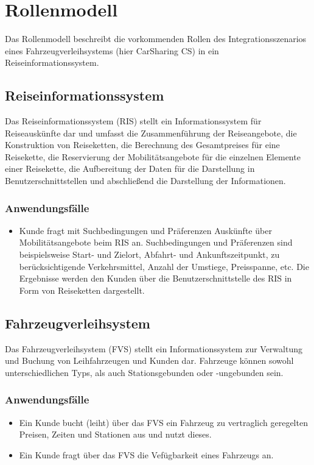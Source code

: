 \chapter{Rollenmodell}
\label{sec:Rollenmodell}

Das Rollenmodell beschreibt die vorkommenden Rollen des Integrationsszenarios eines Fahrzeugverleihsystems (hier CarSharing CS) in ein Reiseinformationssystem.

\section{Reiseinformationssystem}
Das Reiseinformationssystem (RIS) stellt ein Informationssystem für Reiseauskünfte dar und umfasst die Zusammenführung der Reiseangebote, die Konstruktion von Reiseketten, die Berechnung des Gesamtpreises für eine Reisekette, die Reservierung der Mobilitätsangebote für die einzelnen Elemente einer Reisekette, die Aufbereitung der Daten für die Darstellung in Benutzerschnittstellen und abschließend die Darstellung der Informationen.

\subsection*{Anwendungsfälle}
\begin{itemize}
\item Kunde fragt mit Suchbedingungen und Präferenzen Auskünfte über Mobilitätsangebote beim RIS an. Suchbedingungen und Präferenzen sind beispielsweise Start- und Zielort, Abfahrt- und Ankunftszeitpunkt, zu berücksichtigende Verkehrsmittel, Anzahl der Umstiege, Preisspanne, etc. Die Ergebnisse werden den Kunden über die Benutzerschnittstelle des RIS in Form von Reiseketten dargestellt. 
\end{itemize}

\section{Fahrzeugverleihsystem}
Das Fahrzeugverleihsystem (FVS) stellt ein Informationssystem zur Verwaltung und Buchung von Leihfahrzeugen und Kunden dar. Fahrzeuge können sowohl unterschiedlichen Typs, als auch Stationsgebunden oder -ungebunden sein.

\subsection*{Anwendungsfälle}
\begin{itemize}
\item Ein Kunde bucht (leiht) über das FVS ein Fahrzeug zu vertraglich geregelten Preisen, Zeiten und Stationen aus und nutzt dieses.
\item Ein Kunde fragt über das FVS die Vefügbarkeit eines Fahrzeugs an. 
\end{itemize}

